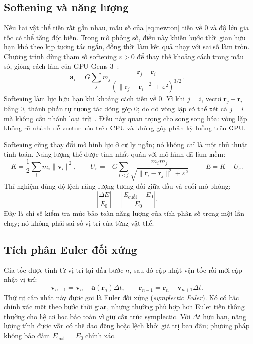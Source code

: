 \subsection{Softening và năng lượng}

Nếu hai vật thể tiến rất gần nhau, mẫu số của \eqref{eq:newton} tiến về 0 và độ lớn gia tốc có thể tăng đột biến. Trong mô phỏng số, điều này khiến bước thời gian hữu hạn khó theo kịp tương tác ngắn, đồng thời làm kết quả nhạy với sai số làm tròn. Chương trình dùng tham số softening $\varepsilon>0$ để thay thế khoảng cách trong mẫu số, giống cách làm của GPU Gems 3~\cite{gpugems3}:
\begin{equation}
\mathbf{a}_i = G\sum_j m_j \frac{\mathbf{r}_j-\mathbf{r}_i}{\left(\lVert\mathbf{r}_j-\mathbf{r}_i\rVert^2+\varepsilon^2\right)^{3/2}}.
\label{eq:soft}
\end{equation}
Softening làm lực hữu hạn khi khoảng cách tiến về 0. Vì khi $j=i$, vectơ $\mathbf{r}_j-\mathbf{r}_i$ bằng 0, thành phần tự tương tác đóng góp 0; do đó vòng lặp có thể xét cả $j=i$ mà không cần nhánh loại trừ~\cite{gpugems3}. Điều này quan trọng cho song song hóa: vòng lặp không rẽ nhánh dễ vector hóa trên CPU và không gây phân kỳ luồng trên GPU.

Softening cũng thay đổi mô hình lực ở cự ly ngắn; nó không chỉ là một thủ thuật tính toán. Năng lượng thế được tính nhất quán với mô hình đã làm mềm:
\begin{equation}
K = \frac{1}{2}\sum_i m_i\lVert\mathbf{v}_i\rVert^2,\qquad
U_\varepsilon = -G\sum_{i<j} \frac{m_i m_j}{\sqrt{\lVert\mathbf{r}_i-\mathbf{r}_j\rVert^2+\varepsilon^2}},
\qquad E=K+U_\varepsilon.
\end{equation}
Thí nghiệm dùng độ lệch năng lượng tương đối giữa đầu và cuối mô phỏng:
\begin{equation}
\left|\frac{\Delta E}{E_0}\right| =\left|\frac{E_{\mathrm{cuối}}-E_0}{E_0}\right|.
\end{equation}
Đây là chỉ số kiểm tra mức bảo toàn năng lượng của tích phân số trong một lần chạy; nó không phải sai số vị trí của từng vật thể.

\subsection{Tích phân Euler đối xứng}

Gia tốc được tính từ vị trí tại đầu bước $n$, sau đó cập nhật vận tốc rồi mới cập nhật vị trí:
\begin{equation}
\mathbf{v}_{n+1}=\mathbf{v}_n+\mathbf{a}(\mathbf{r}_n)\Delta t,\qquad
\mathbf{r}_{n+1}=\mathbf{r}_n+\mathbf{v}_{n+1}\Delta t.
\end{equation}
Thứ tự cập nhật này được gọi là Euler đối xứng (\emph{symplectic Euler}). Nó có bậc chính xác một theo bước thời gian, nhưng thường phù hợp hơn Euler tiến thông thường cho hệ cơ học bảo toàn vì giữ cấu trúc symplectic. Với $\Delta t$ hữu hạn, năng lượng tính được vẫn có thể dao động hoặc lệch khỏi giá trị ban đầu; phương pháp không bảo đảm $E_{\mathrm{cuối}}=E_0$ chính xác.

